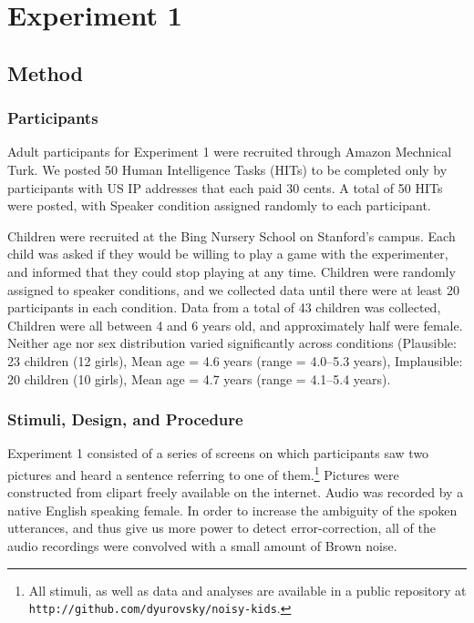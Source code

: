 \documentclass[man,floatsintext]{apa6}
\begin{document}
\section{Experiment 1}

\subsection{Method}
\subsubsection{Participants}

Adult participants for Experiment 1 were recruited through Amazon Mechnical Turk. We posted 50 Human Intelligence Tasks (HITs) to be completed only by participants with US IP addresses that each paid 30 cents. A total of 50 HITs were posted, with Speaker condition assigned randomly to each participant.

Children were recruited at the Bing Nursery School on Stanford's campus. Each child was asked if they would be willing to play a game with the experimenter, and informed that they could stop playing at any time. Children were randomly assigned to speaker conditions, and we collected data until there were at least 20 participants in each condition. Data from a total of 43 children was collected, Children were all between 4 and 6 years old, and approximately half were female. Neither age nor sex distribution varied significantly across conditions (Plausible: 23 children (12 girls), Mean age = 4.6 years (range = 4.0--5.3 years), Implausible: 20 children (10 girls), Mean age = 4.7 years (range = 4.1--5.4 years).

\subsubsection{Stimuli, Design, and Procedure}

Experiment 1 consisted of a series of screens on which participants saw two pictures and heard a sentence referring to one of them.\footnote{All stimuli, as well as data and analyses are available in a public repository at \small{\tt{http://github.com/dyurovsky/noisy-kids}}.} Pictures were constructed from clipart freely available on the internet. Audio was recorded by a native English speaking female. In order to increase the ambiguity of the spoken utterances, and thus give us more power to detect error-correction, all of the audio recordings were convolved with a small amount of Brown noise.
\end{document}
